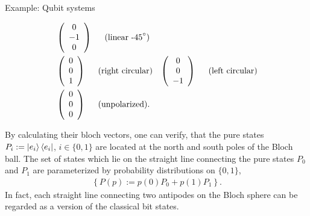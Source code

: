 \begin{section}{Example: Qubit systems}
\begin{remark}
\begin{align*}
    & \left(\begin{array}{c} 0\\ -1 \\ 0 \end{array}\right) \hspace{.5cm} \text{(linear -45}^{\circ}\text{)}  \\ 
    &  \left(\begin{array}{c} 0 \\ 0 \\ 1 \end{array}\right) \hspace{.5cm} \text{(right circular)}  
    & \left(\begin{array}{c} 0\\ 0 \\ -1 \end{array}\right) \hspace{.5cm} \text{(left circular)}   \\
    & \left(\begin{array}{c} 0\\ 0 \\ 0 \end{array}\right) \hspace{.5cm} \text{(unpolarized)}.   
    \end{align*}
   \end{remark}
   By calculating their bloch vectors, one can verify, that the pure states $P_i := \ket{e_i}\bra{e_i}$, $i \in \{0,1\}$ are located at the north and south poles of the Bloch ball. The set of states 
   which lie on the straight line connecting the pure states $P_0$ and $P_1$ are parameterized by probability distributions on $\{0,1\}$, 
   \begin{align*}
    \left\{P(p) := p(0) P_0 + p(1) P_1\right\}.
   \end{align*}
   In fact, each straight line connecting two antipodes on the Bloch sphere can be regarded as a version of the classical bit states. 
   


\end{section}
